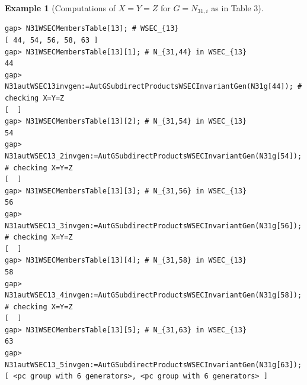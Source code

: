 \documentclass{amsart}
\theoremstyle{plain}
\theoremstyle{definition}
\newtheorem{example}[theorem]{Example}
\theoremstyle{remark}
\begin{document}
\begin{example}[Computations of $X=Y=Z$ for $G=N_{31,i}$ as in Table $3$]
\begin{verbatim}
gap> N31WSECMembersTable[13]; # WSEC_{13}
[ 44, 54, 56, 58, 63 ]
gap> N31WSECMembersTable[13][1]; # N_{31,44} in WSEC_{13}
44
gap> N31autWSEC13invgen:=AutGSubdirectProductsWSECInvariantGen(N31g[44]); # checking X=Y=Z
[  ]
gap> N31WSECMembersTable[13][2]; # N_{31,54} in WSEC_{13}
54
gap> N31autWSEC13_2invgen:=AutGSubdirectProductsWSECInvariantGen(N31g[54]); # checking X=Y=Z
[  ]
gap> N31WSECMembersTable[13][3]; # N_{31,56} in WSEC_{13}
56
gap> N31autWSEC13_3invgen:=AutGSubdirectProductsWSECInvariantGen(N31g[56]); # checking X=Y=Z
[  ]
gap> N31WSECMembersTable[13][4]; # N_{31,58} in WSEC_{13}
58
gap> N31autWSEC13_4invgen:=AutGSubdirectProductsWSECInvariantGen(N31g[58]); # checking X=Y=Z
[  ]
gap> N31WSECMembersTable[13][5]; # N_{31,63} in WSEC_{13}
63
gap> N31autWSEC13_5invgen:=AutGSubdirectProductsWSECInvariantGen(N31g[63]);
[ <pc group with 6 generators>, <pc group with 6 generators> ]
\end{verbatim}
\end{example}
\end{document}
